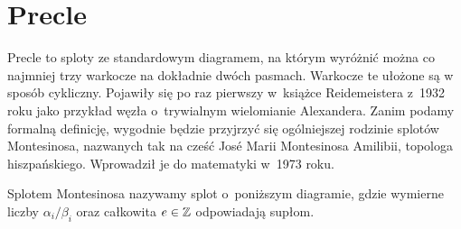 \section{Precle} %
Precle to sploty ze standardowym diagramem, na którym wyróżnić można co najmniej trzy warkocze na dokładnie dwóch pasmach.
Warkocze te ułożone są w sposób cykliczny.
Pojawiły się po raz pierwszy w~książce Reidemeistera z~1932 roku jako przykład węzła o~trywialnym wielomianie Alexandera.
Zanim podamy formalną definicję, wygodnie będzie przyjrzyć się ogólniejszej rodzinie splotów Montesinosa, nazwanych tak na cześć José Marii Montesinosa Amilibii, topologa hiszpańskiego.
Wprowadził je do matematyki w~1973 roku.

\label{sec:pretzel}
\begin{definition}
    Splotem Montesinosa nazywamy splot o~poniższym diagramie, gdzie wymierne liczby $\alpha_i/\beta_i$ oraz całkowita $e \in \mathbb Z$ odpowiadają supłom.
\begin{comment}
    \[
    \begin{tikzpicture}[baseline=-0.65ex, scale=0.1]
        \draw[semithick] (-5, 5) rectangle (5, 15);
        \foreach \x in {0,1,3,4} {
            \draw[semithick] (15*\x-35, -15) rectangle (15*\x-25, -5);
        }
        \foreach \x in {0,1,2,3,4,5} {
            \draw[semithick] (15*\x-35, -8) to (15*\x-40, -8);
            \draw[semithick] (15*\x-35, -12) to (15*\x-40, -12);
        }
        \draw[semithick] (-40, -8) [in=down, out=left] to (-45, -3);
        \draw[semithick] (-40, -12) [in=down, out=left] to (-49, -3);

        \draw[semithick] (-40, 8) [in=up, out=left] to (-45, 3);
        \draw[semithick] (-40, 12) [in=up, out=left] to (-49, 3);

        \draw[semithick] (40, 8) [in=up, out=right] to (45, 3);
        \draw[semithick] (40, 12) [in=up, out=right] to (49, 3);

        \draw[semithick] (40, -8) [in=down, out=right] to (45, -3);
        \draw[semithick] (40, -12) [in=down, out=right] to (49, -3);

        \draw[semithick] (-45, -3)  to (-45, 3);
        \draw[semithick] (-49, -3)  to (-49, 3);
        \draw[semithick] (45, -3)  to (45, 3);
        \draw[semithick] (49, -3)  to (49, 3);

        \draw[semithick] (-5, 8)  to (-40, 8);
        \draw[semithick] ( 5, 8)  to ( 40, 8);
        \draw[semithick] (-5, 12)  to (-40, 12);
        \draw[semithick] ( 5, 12)  to ( 40, 12);

        \node at (0, 10) {e};
        \node at (0, -10) {\ldots};
        \node at (-15, -10) {$\displaystyle \frac{\alpha_2}{\beta_2}$};
        \node at (-30, -10) {$\displaystyle \frac{\alpha_1}{\beta_1}$};
        \node at (15, -10) {$\displaystyle \frac{\alpha_{n-1}}{\beta_{n-1}}$};
        \node at (30, -10) {$\displaystyle \frac{\alpha_n}{\beta_n}$};
    \end{tikzpicture}
    \]
\end{comment}
\end{definition}

